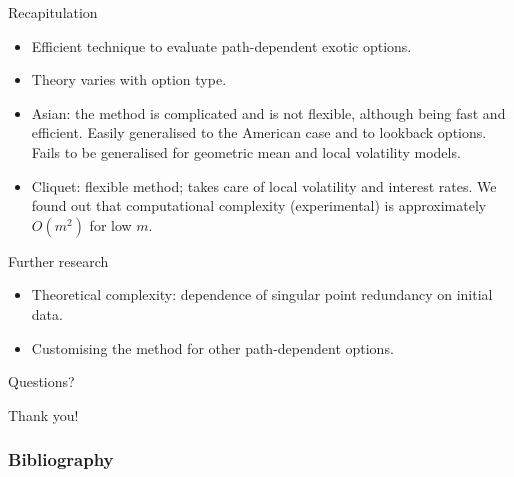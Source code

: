 \documentclass[utf8,t,xcolor=svgnames]{beamer}
\begin{document}
\begin{frame}{Recapitulation}
	\begin{itemize}
		\item Efficient technique to evaluate path-dependent exotic options.
		\item Theory varies with option type.
		\item Asian: the method is complicated and is not flexible, although being fast and efficient. Easily generalised to the American case and to lookback options. \alert{Fails to be generalised for geometric mean and local volatility models.}
		\item Cliquet: flexible method; takes care of local volatility and interest rates. \alert{We found out that computational complexity (experimental) is approximately $ O(m^2) $ for low $ m $}.
	\end{itemize}
	
	Further research
	\begin{itemize}
		\item Theoretical complexity: dependence of singular point redundancy on initial data.
		\item Customising the method for other path-dependent options.
	\end{itemize}
\end{frame}


\begin{frame}[plain,c]
	
	\begin{center}
		{\Huge Questions?}
	\end{center}
	
	\vfill
	
	\begin{center}
		{\Huge Thank you!}
	\end{center}
	
\end{frame}


\appendix

\begin{frame}[allowframebreaks]
	\frametitle<presentation>{Bibliography}
	\printbibliography
\end{frame}
\end{document}
